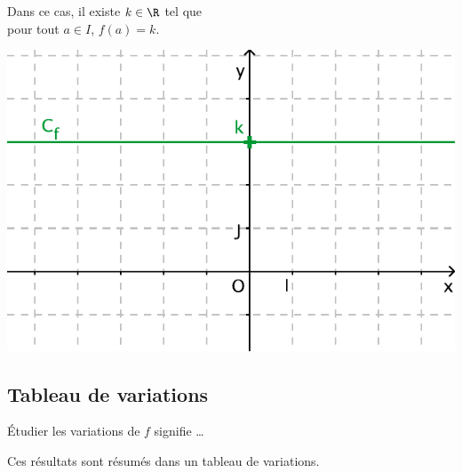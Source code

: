 \begin{minipage}[t]{0.4\linewidth}
  Dans ce cas, il existe $k\in\R$ tel que \\ pour tout $a\in I$, $f(a)=k$.
\end{minipage}
\qquad
\begin{minipage}[c]{0.4\linewidth}
  \includegraphics[width=\textwidth]{F_Constante.pdf}
\end{minipage}



\subsection{Tableau de variations}

\og Étudier les variations de $f$ \fg{} signifie {\ldots}


Ces résultats sont résumés dans un tableau de variations. \\


